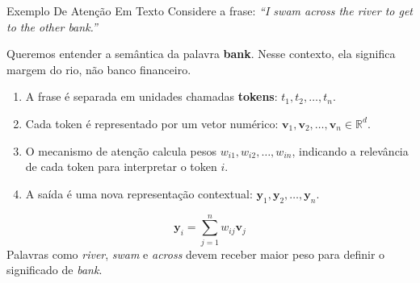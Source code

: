 \begin{frame}{Exemplo De Atenção Em Texto}
    Considere a frase: \textit{``I swam across the river to get to the other bank.''}

    \vspace{0.3em}
    Queremos entender a semântica da palavra \textbf{bank}. Nesse contexto, ela significa margem do rio, não banco financeiro.
    \begin{enumerate}
        \item A frase é separada em unidades chamadas \textbf{tokens}: $t_1, t_2, \ldots, t_n$.
        \item Cada token é representado por um vetor numérico: $\mathbf{v}_1, \mathbf{v}_2, \ldots, \mathbf{v}_n \in \mathbb{R}^d$.
        \item O mecanismo de atenção calcula pesos $w_{i1}, w_{i2}, \ldots, w_{in}$, indicando a relevância de cada token para interpretar o token $i$.
        \item A saída é uma nova representação contextual: $\mathbf{y}_1, \mathbf{y}_2, \ldots, \mathbf{y}_n$.
    \end{enumerate}
    \[
        \mathbf{y}_i = \sum_{j=1}^{n} w_{ij}\mathbf{v}_j
    \]
    \vspace{0.3em}
    Palavras como \textit{river}, \textit{swam} e \textit{across} devem receber maior peso para definir o significado de \textit{bank}.
\end{frame}

